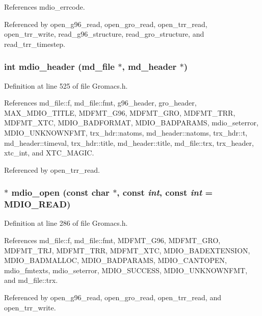 References mdio\_\-errcode.

Referenced by open\_\-g96\_\-read, open\_\-gro\_\-read, open\_\-trr\_\-read, open\_\-trr\_\-write, read\_\-g96\_\-structure, read\_\-gro\_\-structure, and read\_\-trr\_\-timestep.
\subsubsection{\setlength{\rightskip}{0pt plus 5cm}int mdio\_\-header ({\bf md\_\-file} $\ast$, {\bf md\_\-header} $\ast$)\hspace{0.3cm}{\tt  [static]}}\label{Gromacs_8h_a38}




Definition at line 525 of file Gromacs.h.

References md\_\-file::f, md\_\-file::fmt, g96\_\-header, gro\_\-header, MAX\_\-MDIO\_\-TITLE, MDFMT\_\-G96, MDFMT\_\-GRO, MDFMT\_\-TRR, MDFMT\_\-XTC, MDIO\_\-BADFORMAT, MDIO\_\-BADPARAMS, mdio\_\-seterror, MDIO\_\-UNKNOWNFMT, trx\_\-hdr::natoms, md\_\-header::natoms, trx\_\-hdr::t, md\_\-header::timeval, trx\_\-hdr::title, md\_\-header::title, md\_\-file::trx, trx\_\-header, xtc\_\-int, and XTC\_\-MAGIC.

Referenced by open\_\-trr\_\-read.
\subsubsection{ $\ast$ mdio\_\-open (const char $\ast$, const {\em int}, const {\em int} = MDIO\_\-READ)\hspace{0.3cm}{\tt  [static]}}\label{Gromacs_8h_a36}




Definition at line 286 of file Gromacs.h.

References md\_\-file::f, md\_\-file::fmt, MDFMT\_\-G96, MDFMT\_\-GRO, MDFMT\_\-TRJ, MDFMT\_\-TRR, MDFMT\_\-XTC, MDIO\_\-BADEXTENSION, MDIO\_\-BADMALLOC, MDIO\_\-BADPARAMS, MDIO\_\-CANTOPEN, mdio\_\-fmtexts, mdio\_\-seterror, MDIO\_\-SUCCESS, MDIO\_\-UNKNOWNFMT, and md\_\-file::trx.

Referenced by open\_\-g96\_\-read, open\_\-gro\_\-read, open\_\-trr\_\-read, and open\_\-trr\_\-write.
